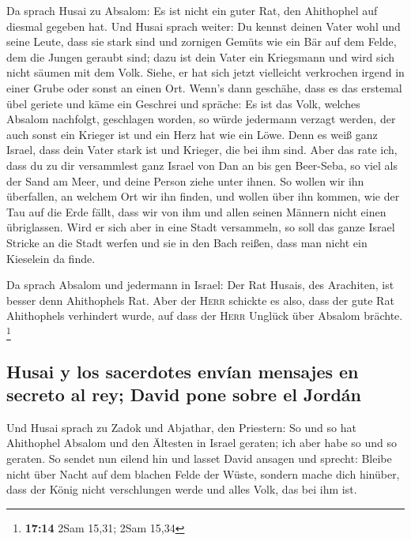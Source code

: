  Da sprach Husai zu Absalom: Es ist nicht ein guter Rat,
den Ahithophel auf diesmal gegeben hat.  Und Husai sprach
weiter: Du kennst deinen Vater wohl und seine Leute, dass sie stark sind
und zornigen Gemüts wie ein Bär auf dem Felde, dem die Jungen geraubt
sind; dazu ist dein Vater ein Kriegsmann und wird sich nicht säumen mit
dem Volk.  Siehe, er hat sich jetzt vielleicht verkrochen
irgend in einer Grube oder sonst an einen Ort. Wenn's dann geschähe,
dass es das erstemal übel geriete und käme ein Geschrei und spräche: Es
ist das Volk, welches Absalom nachfolgt, geschlagen worden,
 so würde jedermann verzagt werden, der auch sonst ein
Krieger ist und ein Herz hat wie ein Löwe. Denn es weiß ganz Israel,
dass dein Vater stark ist und Krieger, die bei ihm sind. 
Aber das rate ich, dass du zu dir versammlest ganz Israel von Dan an bis
gen Beer-Seba, so viel als der Sand am Meer, und deine Person ziehe
unter ihnen.  So wollen wir ihn überfallen, an welchem
Ort wir ihn finden, und wollen über ihn kommen, wie der Tau auf die Erde
fällt, dass wir von ihm und allen seinen Männern nicht einen
übriglassen.  Wird er sich aber in eine Stadt versammeln,
so soll das ganze Israel Stricke an die Stadt werfen und sie in den Bach
reißen, dass man nicht ein Kieselein da finde.

 Da sprach Absalom und jedermann in Israel: Der Rat
Husais, des Arachiten, ist besser denn Ahithophels Rat. Aber der
\textsc{Herr} schickte es also, dass der gute Rat Ahithophels verhindert
wurde, auf dass der \textsc{Herr} Unglück über Absalom brächte.
\footnote{\textbf{17:14} 2Sam 15,31; 2Sam 15,34}

\hypertarget{husai-y-los-sacerdotes-envuxedan-mensajes-en-secreto-al-rey-david-pone-sobre-el-jorduxe1n}{%
\subsection{Husai y los sacerdotes envían mensajes en secreto al rey;
David pone sobre el
Jordán}\label{husai-y-los-sacerdotes-envuxedan-mensajes-en-secreto-al-rey-david-pone-sobre-el-jorduxe1n}}

 Und Husai sprach zu Zadok und Abjathar, den Priestern:
So und so hat Ahithophel Absalom und den Ältesten in Israel geraten; ich
aber habe so und so geraten.  So sendet nun eilend hin
und lasset David ansagen und sprecht: Bleibe nicht über Nacht auf dem
blachen Felde der Wüste, sondern mache dich hinüber, dass der König
nicht verschlungen werde und alles Volk, das bei ihm ist.

